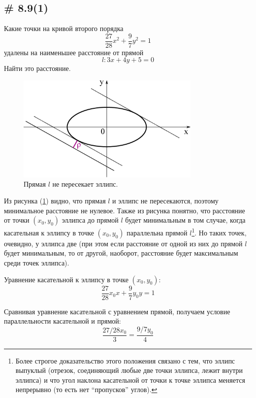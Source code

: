 \documentclass[a4paper,12pt]{article}
\begin{document}
  
  \subsection{\# 8.9(1)}
  
  Какие точки на кривой второго порядка
  \[
    \frac{27}{28} x^2 + \frac{9}{7} y^2 = 1
  \]
  удалены на наименьшее расстояние от прямой
  \[
    l\colon 3x + 4y + 5 = 0
  \]
  Найти это расстояние.
  
  \begin{solution}
    \begin{figure}[h]
      \centering

      \includegraphics[width=0.8\textwidth]{ellipse-8-9}
    
      \caption{Прямая $l$ не пересекает эллипс.}
      \label{fig:ellipse-8-9}
    \end{figure}
    
    Из рисунка (\ref{fig:ellipse-8-9}) видно, что прямая $l$ и эллипс не пересекаются, поэтому минимальное расстояние не нулевое.
    Также из рисунка понятно, что расстояние от точки $(x_0, y_0)$ эллипса до прямой $l$ будет минимальным в том случае, когда касательная к эллипсу в точке $(x_0, y_0)$ параллельна прямой $l$\footnote{Более строгое доказательство этого положения связано с тем, что эллипс выпуклый (отрезок, соединяющий любые две точки эллипса, лежит внутри эллипса) и что угол наклона касательной от точки к точке эллипса меняется непрерывно (то есть нет ``пропусков'' углов).}.
    Но таких точек, очевидно, у эллипса две (при этом если расстояние от одной из них до прямой $l$ будет минимальным, то от другой, наоборот, расстояние будет максимальным среди точек эллипса).
    
    Уравнение касательной к эллипсу в точке $(x_0, y_0)$:
    \[
      \frac{27}{28} x_0 x + \frac{9}{7} y_0 y = 1
    \]
    
    Сравнивая уравнение касательной с уравнением прямой, получаем условие параллельности касательной и прямой:
    \[
      \frac{27/28 x_0}{3} = \frac{9/7 y_0}{4}
    \]
    

\end{solution}
\end{document}
